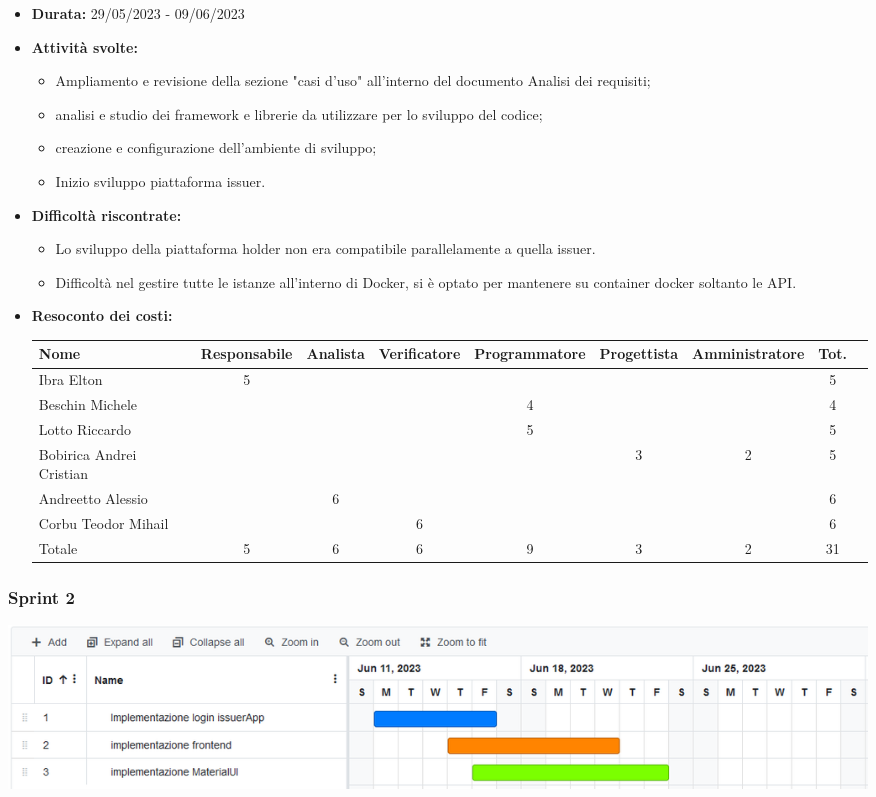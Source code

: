 \begin{itemize}
\item \textbf{Durata:} 29/05/2023 - 09/06/2023 
\item \textbf{Attività svolte:}
\begin{itemize}
    \item Ampliamento e revisione della sezione "casi d'uso" all'interno del documento Analisi dei requisiti;
    \item analisi e studio dei framework e librerie da utilizzare per lo sviluppo del codice;
    \item creazione e configurazione dell'ambiente di sviluppo;
    \item Inizio sviluppo piattaforma issuer.
\end{itemize}
\item \textbf{Difficoltà riscontrate:}
\begin{itemize}
    \item Lo sviluppo della piattaforma holder non era compatibile parallelamente a quella issuer. 
    \item Difficoltà nel gestire tutte le istanze all'interno di Docker\glo, si è optato per mantenere su container docker soltanto le API.
\end{itemize}
\item \textbf{Resoconto dei costi:}
\begin{longtable}{|p{}|c|c|c|c|c|c|c|c|}
    \hline
    Nome & Responsabile & Analista & Verificatore & Programmatore & Progettista & Amministratore & Tot.\\
    \hline
    Ibra Elton &5 & & & & & &5\\
    \hline
    Beschin Michele & & & &4 & & &4 \\
    \hline
    Lotto Riccardo & & & &5 & & &5 \\
    \hline
    Bobirica Andrei Cristian & & & & &3 &2 &5 \\
    \hline
    Andreetto Alessio & &6 & & & & &6 \\
    \hline
    Corbu Teodor Mihail & & &6 & & & &6 \\
    \hline
    Totale &5 &6 &6 &9 &3 &2 &31 \\
    \hline
\end{longtable}
\end{itemize}

\subsubsection{Sprint 2}
\begin{center}
    \includegraphics[scale = 0.45]{./res/img/Sprint_2.png}
  \end{center}

